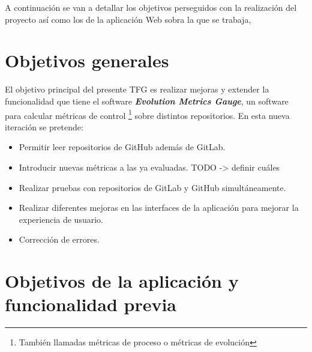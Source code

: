 


A continuación se van a detallar los objetivos perseguidos con la realización del proyecto así como los de la aplicación Web sobra la que se trabaja,
\section{Objetivos generales}
El objetivo principal del presente TFG es realizar mejoras y extender la funcionalidad que tiene el software \textit{\textbf{Evolution Metrics Gauge}}, un software para calcular métricas de control \footnote{También llamadas métricas de proceso o métricas de evolución} sobre distintos repositorios.
En esta nueva iteración se pretende:

\begin{itemize}
	\tightlist
	\item Permitir leer repositorios de GitHub además de GitLab.
	\item Introducir nuevas métricas a las ya evaluadas. TODO -> definir cuáles
	\item Realizar pruebas con repositorios de GitLab y GitHub simultáneamente.
	\item Realizar diferentes mejoras en las interfaces de la aplicación para mejorar la experiencia de usuario.
	\item Corrección de errores.
\end{itemize}

\newpage


\section{Objetivos de la aplicación y funcionalidad previa}
   
